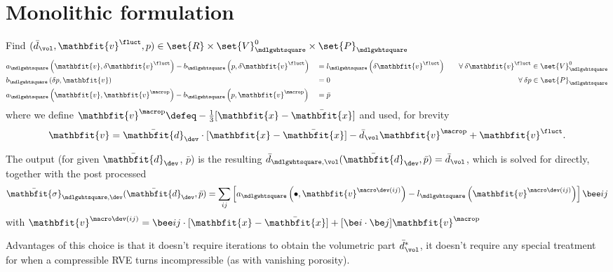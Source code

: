 \documentclass[a4paper,11pt]{article}
\renewcommand{\ta}[1]{\mathbfit{#1}}
\renewcommand{\ts}[1]{\mathbfit{#1}}
\renewcommand{\Box}{\mdlgwhtsquare}
\newcommand{\pressure}{\mathrm{p}}
\begin{document}
\section{Monolithic formulation}
Find $(\bar{d}_\vol, \ta v^\fluct, p) \in \set{R} \times \set{V}_\Box^0 \times \set{P}_\Box$
\begin{align}
 &a_\Box \left(\ta v, \delta\ta v^\fluct \right) -b_\Box \left(p,\delta\ta v^\fluct\right) &&= l_\Box\left(\delta\ta v^\fluct\right)\quad &\forall\:\delta\ta v^\fluct \in \set{V}_\Box^0\\
 &b_\Box\left(\delta p, \ta v\right) &&= 0 \quad &\forall\: \delta p \in \set{P}_\Box\\
 &a_\Box\left(\ta v, \ta v^{\macro\pressure}\right) - b_\Box\left(p,\ta v^{\macro\pressure}\right) &&= \bar p &
\end{align}
where we define $\ta v^{\macro\pressure} \defeq -\frac13[\ta x - \bar{\ta x}]$ and used, for brevity
\begin{align}
 \ta v = \bar{\ts d}_\dev \cdot [\ta x - \bar{\ta x}] - \bar{d}_\vol \ta v^{\macro\pressure} + \ta v^\fluct.
\end{align}

The output (for given $\bar{\ts d}_\dev$, $\bar p$) is the resulting $\bar{d}_{\Box,\vol}(\bar{\ts d}_\dev,\bar p) = \bar{d}_\vol$, which is solved for directly, together with the post processed
\begin{align}
 \bar{\ts\sigma}_{\Box,\dev}(\bar{\ts d}_\dev,\bar p) = \sum_{ij} \left[ a_\Box\left(\bullet, \ta v^{\macro\dev(ij)}\right) - l_\Box\left(\ta v^{\macro\dev(ij)}\right)\right] \bee ij
\end{align}
with $\ta v^{\macro\dev(ij)} = \bee ij \cdot [\ta x - \bar{\ta x}] + [\be i\cdot\be j]\ta v^{\macro\pressure}$

Advantages of this choice is that it doesn't require iterations to obtain the volumetric part $\bar{d}_\vol^*$, it doesn't require any special treatment for when a compressible RVE turns incompressible (as with vanishing porosity).
\end{document}
